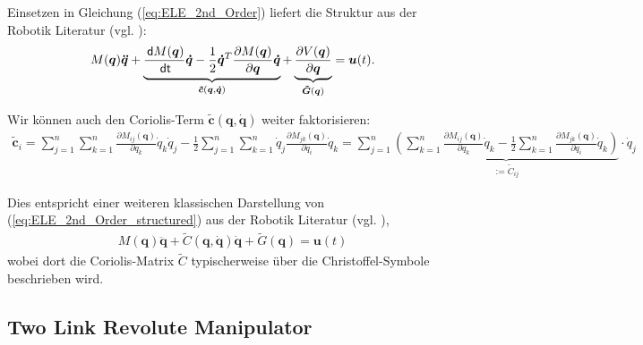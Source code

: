 \documentclass[a4paper, 12pt]{scrartcl}
\newcommand{\dt}{\thinspace \mathsf{dt}}
\newcommand{\dd}{\thinspace \mathsf{d}}
\begin{document}
Einsetzen in Gleichung (\ref{eq:ELE_2nd_Order}) liefert die Struktur 
aus der Robotik Literatur (vgl. \cite{Lutter}):
\begin{align}\label{eq:ELE_2nd_Order_structured}
    M(\bm{q}) \bm{\ddot{q}} 
    + 
    \underbrace{
        \frac{\dd M(\bm{q})}{\dt} \bm{\dot{q}} 
        -
        \frac{1}{2} \bm{\dot{q}}^T 
        \frac{\partial M(\bm{q})}{\partial \bm{q}} 
        \bm{\dot{q}}
    }_{
        \bm{\tilde{c}}(\bm{q}, \bm{\dot{q}})
    }
    +
    \underbrace{
        \frac{\partial V(\bm{q})}{\partial \bm{q}}
    }_{
        \bm{\tilde{G}}(\bm{q})
    }
    =
    \bm{u}(t). 
\end{align}

Wir können auch den Coriolis-Term $\bm{\tilde{c}}(\bm{q},\bm{\dot{q}})$ weiter faktorisieren:
\begin{align*}
    \bm{\tilde{c}}_i 
    =
    \sum_{j=1}^{n} 
        \sum_{k=1}^{n}
            \frac{\partial M_{ij}(\bm{q})}{\partial q_k} 
            \dot{q}_k
            \dot{q}_j
    - 
    \frac{1}{2}
    \sum_{j=1}^{n} 
        \sum_{k=1}^{n}
            \dot{q}_j 
            \frac{\partial M_{jk}(\bm{q})}{\partial q_i}
            \dot{q}_k
    =
    \sum_{j=1}^{n}
        \underbrace{
            \left(
                \sum_{k=1}^{n}
                \frac{\partial M_{ij}(\bm{q})}{\partial q_k} 
                \dot{q}_k
                -
                \frac{1}{2}
                \sum_{k=1}^{n}
                \frac{\partial M_{jk}(\bm{q})}{\partial q_i}
                \dot{q}_k
            \right)
        }_{
            := \tilde{C}_{ij}
        }
        \cdot 
        \dot{q}_j
\end{align*}

Dies entspricht einer weiteren klassischen Darstellung von 
(\ref{eq:ELE_2nd_Order_structured}) aus der Robotik Literatur
(vgl. \cite{spong2004}), 
\begin{align}\label{eq:Robotik_Standard}
    M(\bm{q}) \bm{\ddot{q}} + \tilde{C}(\bm{q},\bm{\dot{q}}) \bm{\dot{q}} 
    + 
    \tilde{G}(\bm{q})
    = 
    \bm{u}(t)
\end{align}
%
wobei dort die Coriolis-Matrix 
$\tilde{C}$ typischerweise über die Christoffel-Symbole beschrieben wird.

\subsection{Two Link Revolute Manipulator}\label{chapter:Roboterherleitung}
\end{document}
